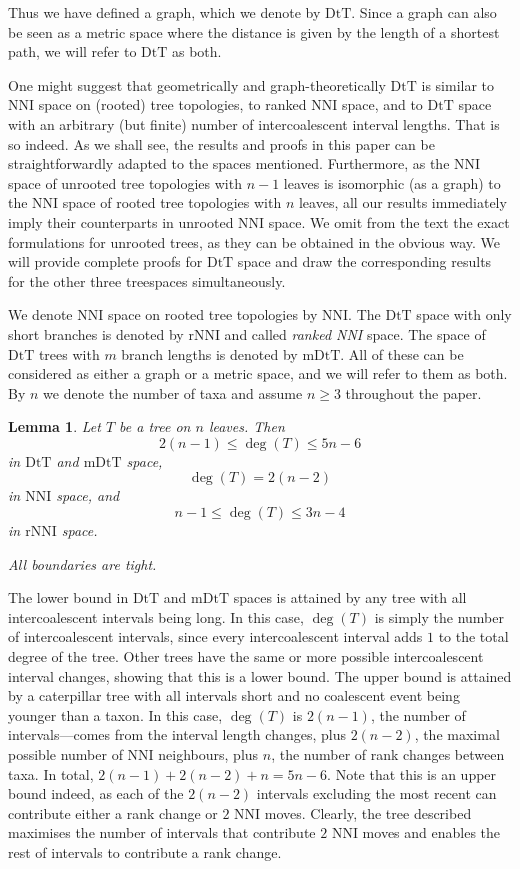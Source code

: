 \documentclass{amsart}
\newtheorem{lemma}{Lemma}
\newcommand{\dts}{\mathrm{DtT}}
\newcommand{\nni}{\mathrm{NNI}}
\newcommand{\rnni}{\mathrm{rNNI}}
\newcommand{\mdts}{\mathrm{mDtT}}
\begin{document}
Thus we have defined a graph, which we denote by $\dts$.
Since a graph can also be seen as a metric space where the distance is given by the length of a shortest path, we will refer to $\dts$ as both.

One might suggest that geometrically and graph-theoretically $\dts$ is similar to NNI space on (rooted) tree topologies, to ranked NNI space, and to $\dts$ space with an arbitrary (but finite) number of intercoalescent interval lengths.
That is so indeed.
As we shall see, the results and proofs in this paper can be straightforwardly adapted to the spaces mentioned.
Furthermore, as the NNI space of unrooted tree topologies with $n-1$ leaves is isomorphic (as a graph) to the NNI space of rooted tree topologies with $n$ leaves, all our results immediately imply their counterparts in unrooted NNI space.
We omit from the text the exact formulations for unrooted trees, as they can be obtained in the obvious way.
We will provide complete proofs for $\dts$ space and draw the corresponding results for the other three treespaces simultaneously.

We denote NNI space on rooted tree topologies by $\nni$.
The $\dts$ space with only short branches is denoted by $\rnni$ and called {\em ranked NNI} space.
The space of $\dts$ trees with $m$ branch lengths is denoted by $\mdts$.
All of these can be considered as either a graph or a metric space, and we will refer to them as both.
By $n$ we denote the number of taxa and assume $n \geq 3$ throughout the paper.

\begin{lemma}\label{neighBound}
Let $T$ be a tree on $n$ leaves. 
Then
\[2(n-1) \leq \deg(T) \leq 5n-6\] in $\dts$ and $\mdts$ space,
\[\deg(T) = 2(n-2)\] in $\nni$ space, and
\[n-1\leq \deg(T) \leq3n-4\] in $\rnni$ space.

All boundaries are tight.
\end{lemma}

\proof
The lower bound in $\dts$ and $\mdts$ spaces is attained by any tree with all intercoalescent intervals being long.
In this case, $\deg(T)$ is simply the number of intercoalescent intervals, since every intercoalescent interval adds $1$ to the total degree of the tree.
Other trees have the same or more possible intercoalescent interval changes, showing that this is a lower bound.
The upper bound is attained by a caterpillar tree with all intervals short and no coalescent event being younger than a taxon.
In this case, $\deg(T)$ is $2(n-1)$, the number of intervals---comes from the interval length changes, plus $2(n-2)$, the maximal possible number of NNI neighbours, plus $n$, the number of rank changes between taxa.
In total, $2(n-1) + 2(n-2) + n = 5n-6$.
Note that this is an upper bound indeed, as each of the $2(n-2)$ intervals excluding the most recent can contribute either a rank change or $2$ NNI moves.
Clearly, the tree described maximises the number of intervals that contribute $2$ NNI moves and enables the rest of intervals to contribute a rank change.
\end{document}
